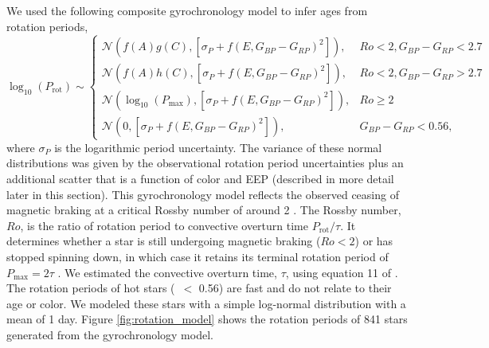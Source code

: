 We used the following composite gyrochronology model to infer ages from
rotation periods,
\begin{equation}
    \log_{10}(P_\mathrm{rot}) \sim \begin{cases}
        \mathcal{N}\left(f(A)g(C), [\sigma_P+f(E, G_{BP} - G_{RP})^2]\right), & Ro < 2,
        G_{BP} - G_{RP} < 2.7 \\
        \mathcal{N}(f(A)h(C), [\sigma_P+f(E, G_{BP} - G_{RP})^2]), & Ro < 2,
        G_{BP} - G_{RP} > 2.7 \\
        \mathcal{N}(\log_{10}(P_\mathrm{max}), [\sigma_P+f(E, G_{BP} - G_{RP})^2]),& Ro \geq 2 \\
        \mathcal{N}(0, [\sigma_P+f(E, G_{BP}-G_{RP})^2]),& G_{BP} - G_{RP} <
        0.56,
    \end{cases}
\label{eqn:gyro}
\end{equation}
where $\sigma_P$ is the logarithmic period uncertainty.
The variance of these normal distributions was given by the observational
rotation period uncertainties plus an additional scatter that is a function
of color and EEP (described in more detail later in this section).
This gyrochronology model reflects the observed ceasing of magnetic braking at
a critical Rossby number of around 2 \citep{vansaders2016}.
The Rossby number, $Ro$, is the ratio of rotation period to convective
overturn time $P_{\mathrm{rot}}/\tau$.
It determines whether a star is still undergoing magnetic braking ($Ro < 2$)
or has stopped spinning down, in which case it retains its terminal rotation
period of $P_\mathrm{max} = 2\tau$ \citep{vansaders2016}.
We estimated the convective overturn time, $\tau$, using equation 11 of
\citet{wright2011}.
The rotation periods of hot stars (\gcolor\ $<$ 0.56) are fast and do
not relate to their age or color.
We modeled these stars with a simple log-normal distribution with a mean of 1
day.
Figure \ref{fig:rotation_model} shows the rotation periods of 841
stars generated from the gyrochronology model.
